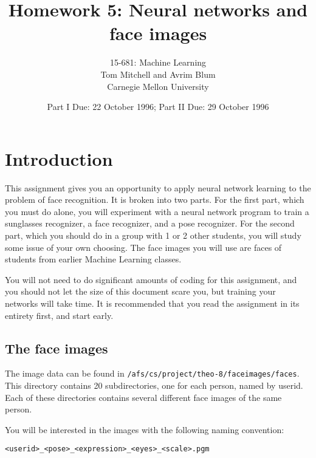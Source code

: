 \def\BOX#1{\fbox{\tt #1}}


\title{Homework 5: Neural networks and face images }
\author{15-681: Machine Learning \\
Tom Mitchell and Avrim Blum \\
Carnegie Mellon University}
\date{Part I Due: 22 October 1996; Part II Due: 29 October 1996}
\maketitle

\section{Introduction}

This assignment gives you an opportunity to apply neural network learning to
the problem of face recognition.  It is broken into two parts.  For the first
part, which you must do alone, you will experiment with a neural network
program to train a sunglasses recognizer, a face recognizer, and a pose
recognizer.  For the second part, which you should do in a group with 1 or 2
other students, you will study some issue of your own choosing.  The face
images you will use are faces of students from earlier Machine Learning
classes.

You will not need to do significant amounts of coding for this assignment,
and you should not let the size of this document scare you, but training
your networks will take time.  It is recommended that you read the
assignment in its entirety first, and start early.

\subsection{The face images}

The image data can be found in {\tt /afs/cs/project/theo-8/faceimages/faces}.
This directory contains 20 subdirectories, one for each person, named by
userid.  Each of these directories contains several different face images of
the same person.

You will be interested in the images with the following naming convention:

{\tt <userid>\_<pose>\_<expression>\_<eyes>\_<scale>.pgm}

